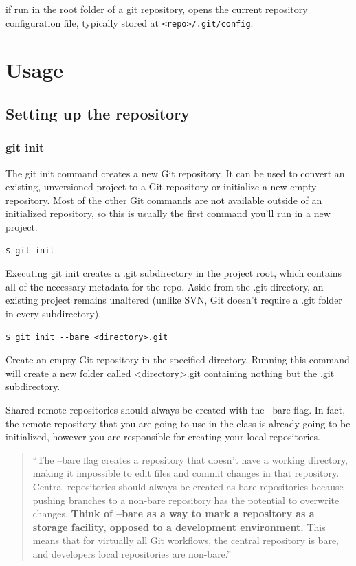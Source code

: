 \documentclass{article}
\newif\ifinstall
\begin{document}
if run in the root folder of a git repository, opens the current
repository configuration file, typically stored at
\texttt{<repo>/.git/config}. 



\ifinstall
\else
\section{Usage}

\subsection{Setting up the repository}

\subsubsection*{git init}

The git init command creates a new Git repository. It can be used to
convert an existing, unversioned project to a Git repository or
initialize a new empty repository. Most of the other Git commands are
not available outside of an initialized repository, so this is usually
the first command you'll run in a new project. 

\begin{lstlisting}
$ git init
\end{lstlisting}

Executing git init creates a .git subdirectory in the project root,
which contains all of the necessary metadata for the repo. Aside from
the .git directory, an existing project remains unaltered (unlike SVN,
Git doesn't require a .git folder in every subdirectory). 

\begin{lstlisting}
$ git init --bare <directory>.git
\end{lstlisting}

Create an empty Git repository in the specified directory. Running
this command will create a new folder called <directory>.git containing
nothing but the .git subdirectory.

Shared remote repositories should always be created with the --bare
flag. In fact, the remote repository that you are going to use in the
class is already going to be initialized, however you are responsible
for creating your local repositories.

\blockquote{
``The --bare flag creates a repository that doesn't have a working directory, making it impossible to edit files and commit changes in that repository. Central repositories should always be created as bare repositories because pushing branches to a non-bare repository has the potential to overwrite changes. \textbf{Think of --bare as a way to mark a repository as a storage facility, opposed to a development environment.} This means that for virtually all Git workflows, the central repository is bare, and developers local repositories are non-bare.''
}
\end{document}
